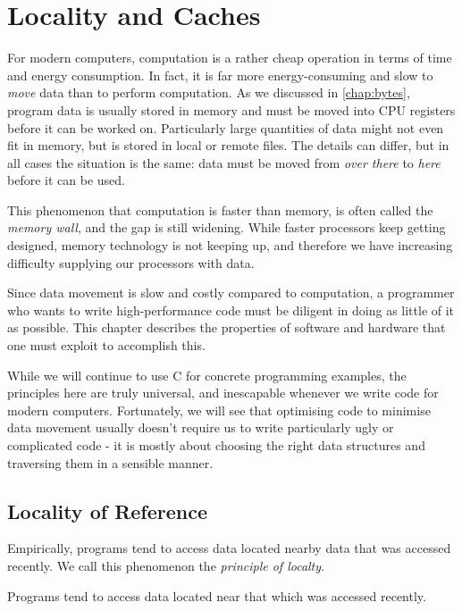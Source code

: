 \chapter{Locality and Caches}
\label{chap:locality}

For modern computers, computation is a rather cheap operation in terms
of time and energy consumption.  In fact, it is far more
energy-consuming and slow to \emph{move} data than to perform
computation.  As we discussed in \cref{chap:bytes}, program data is
usually stored in memory and must be moved into CPU registers before
it can be worked on.  Particularly large quantities of data might not
even fit in memory, but is stored in local or remote files.  The
details can differ, but in all cases the situation is the same: data
must be moved from \emph{over there} to \emph{here} before it can be
used.

This phenomenon that computation is faster than memory, is often
called the \emph{memory wall}, and the gap is still widening.  While
faster processors keep getting designed, memory technology is not
keeping up, and therefore we have increasing difficulty supplying our
processors with data.

Since data movement is slow and costly compared to computation, a
programmer who wants to write high-performance code must be diligent
in doing as little of it as possible.  This chapter describes the
properties of software and hardware that one must exploit to
accomplish this.

While we will continue to use C for concrete programming examples, the
principles here are truly universal, and inescapable whenever we write
code for modern computers.  Fortunately, we will see that optimising
code to minimise data movement usually doesn't require us to write
particularly ugly or complicated code - it is mostly about choosing
the right data structures and traversing them in a sensible manner.

\section{Locality of Reference}

Empirically, programs tend to access data located nearby data that was
accessed recently.  We call this phenomenon the \emph{principle of
  localty}.

\begin{definition}
  Programs tend to access data located near that which was accessed
  recently.
\end{definition}

